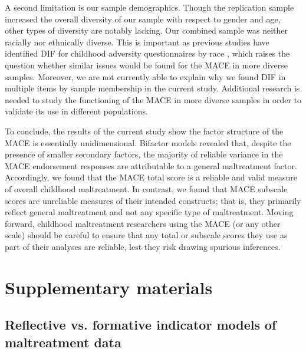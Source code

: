 \documentclass[letterpaper,man,natbib,noextraspace,floatsintext,longtable,12pt]{apa6}
\begin{document}
A second limitation is our sample demographics. Though the replication sample increased the overall diversity of our sample with respect to gender and age, other types of diversity are notably lacking. Our combined sample was neither racially nor ethnically diverse. This is important as previous studies have identified DIF for childhood adversity questionnaires by race \citep{rodriguez2019identification}, which raises the question whether similar issues would be found for the MACE in more diverse samples. Moreover, we are not currently able to explain why we found DIF in multiple items by sample membership in the current study. Additional research is needed to study the functioning of the MACE in more diverse samples in order to validate its use in different populations. 

To conclude, the results of the current study show the factor structure of the MACE is essentially unidimensional. Bifactor models revealed that, despite the presence of smaller secondary factors, the majority of reliable variance in the MACE endorsement responses are attributable to a general maltreatment factor. Accordingly, we found that the MACE total score is a reliable and valid measure of overall childhood maltreatment. In contrast, we found that MACE subscale scores are unreliable measures of their intended constructs; that is, they primarily reflect general maltreatment and not any specific type of maltreatment. Moving forward, childhood maltreatment researchers using the MACE (or any other scale) should be careful to ensure that any total or subscale scores they use as part of their analyses are reliable, lest they risk drawing spurious inferences. 



\pagebreak
\section{Supplementary materials}

\setcounter{figure}{0}
\setcounter{table}{0}
\renewcommand{\thetable}{S\arabic{table}}
\renewcommand{\thefigure}{S\arabic{figure}}

\subsection*{Reflective vs. formative indicator models of maltreatment data}
\end{document}
